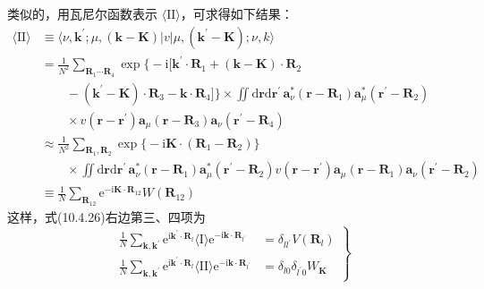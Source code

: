 类似的，用瓦尼尔函数表示 $\langle\mathrm{II}\rangle$，可求得如下结果：
\begin{equation}
\begin{aligned}
  \langle\mathrm{II}\rangle&\equiv\langle\nu,\boldsymbol{k}^{\prime};
  \mu,(\boldsymbol{k}-\boldsymbol{K})|v|\mu,(\boldsymbol{k}^{\prime}-\boldsymbol{K});
  \nu,k\rangle\\
  &=\frac{1}{N^{2}}\sum_{\boldsymbol{R}_{1}\cdots\boldsymbol{R}_{4}}
  \exp\bigl\{-\mathrm{i}[\boldsymbol{k}^{\prime}\cdot\boldsymbol{R}_{1}
  +(\boldsymbol{k}-\boldsymbol{K})\cdot\boldsymbol{R}_{2}\\
  &\qquad-(\boldsymbol{k}^{\prime}-\boldsymbol{K})\cdot\boldsymbol{R}_{3}
  -\boldsymbol{k}\cdot\boldsymbol{R}_{4}]\bigr\}
  \times\iint\mathrm{d}\boldsymbol{r}\mathrm{d}\boldsymbol{r}^{\prime}\,
  \boldsymbol{a}_{\nu}^{*}(\boldsymbol{r}-\boldsymbol{R}_{1})
  \boldsymbol{a}_{\mu}^{*}(\boldsymbol{r}^{\prime}-\boldsymbol{R}_{2})\\
  &\qquad\times v(\boldsymbol{r}-\boldsymbol{r}^{\prime})
  \boldsymbol{a}_{\mu}(\boldsymbol{r}-\boldsymbol{R}_{3})
  \boldsymbol{a}_{\nu}(\boldsymbol{r}^{\prime}-\boldsymbol{R}_{4})\\
  &\approx\frac{1}{N^{2}}\sum_{\boldsymbol{R}_{1},\boldsymbol{R}_{2}}
  \exp\bigl\{-\mathrm{i}\boldsymbol{K}\cdot(\boldsymbol{R}_{1}-\boldsymbol{R}_{2})\bigr\}\\
  &\qquad\times\iint\mathrm{d}\boldsymbol{r}\mathrm{d}\boldsymbol{r}^{\prime}\,
  \boldsymbol{a}_{\nu}^{*}(\boldsymbol{r}-\boldsymbol{R}_{1})
  \boldsymbol{a}_{\mu}^{*}(\boldsymbol{r}^{\prime}-\boldsymbol{R}_{2})
  v(\boldsymbol{r}-\boldsymbol{r}^{\prime})
  \boldsymbol{a}_{\mu}(\boldsymbol{r}-\boldsymbol{R}_{1})
  \boldsymbol{a}_{\nu}(\boldsymbol{r}^{\prime}-\boldsymbol{R}_{2})\\
  &\equiv\frac{1}{N}\sum_{\boldsymbol{R}_{12}}
  \mathrm{e}^{-\mathrm{i}\boldsymbol{K}\cdot\boldsymbol{R}_{12}}W(\boldsymbol{R}_{12})
\end{aligned}
\end{equation}
这样，式(10.4.26)右边第三、四项为
\begin{equation}
\left.
\begin{aligned}
  \frac{1}{N}\sum_{\boldsymbol{k},\boldsymbol{k}^{\prime}}
  \mathrm{e}^{\mathrm{i}\boldsymbol{k}^{\prime}\cdot\boldsymbol{R}_{l}}
  \langle\mathrm{I}\rangle
  \mathrm{e}^{-\mathrm{i}\boldsymbol{k}\cdot\boldsymbol{R}_{l^{\prime}}}
  &=\delta_{ll^{\prime}}V(\boldsymbol{R}_{l})\\
  \frac{1}{N}\sum_{\boldsymbol{k},\boldsymbol{k}^{\prime}}
  \mathrm{e}^{\mathrm{i}\boldsymbol{k}^{\prime}\cdot\boldsymbol{R}_{l}}
  \langle\mathrm{II}\rangle
  \mathrm{e}^{-\mathrm{i}\boldsymbol{k}\cdot\boldsymbol{R}_{l^{\prime}}}
  &=\delta_{l0}\delta_{l^{\prime}0}W_{\boldsymbol{K}}
\end{aligned}\right\}
\end{equation}
